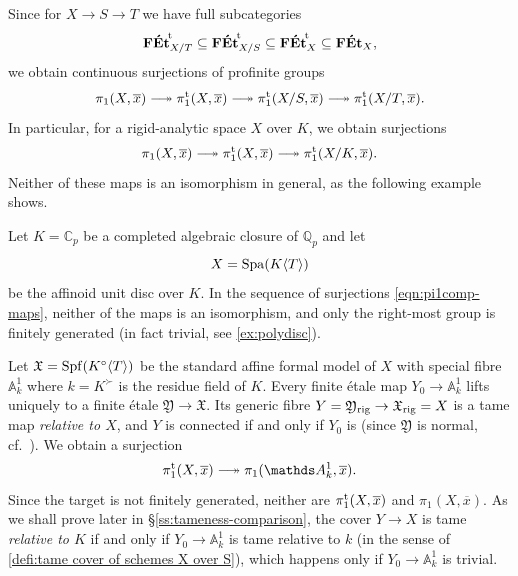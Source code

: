 Since for $X\to S\to T$ we have full subcategories 
\[
    {\mathbf{F\acute{E}t}}^{\!\mathrm{t}}_{X/T}\subseteq  {\mathbf{F\acute{E}t}}^{\!\mathrm{t}}_{X/S}\subseteq {\mathbf{F\acute{E}t}}^{\!\mathrm{t}}_X\subseteq \mathbf{F\acute{E}t}_X,
\]
we obtain continuous surjections of profinite groups
\[ 
    \pi_1(X, \overline{x}) \surj \pitame(X, \overline{x}) \surj \pitame(X/S,\overline{x}) \surj \pitame(X/T,\overline{x}).
\]
In particular, for a rigid-analytic space $X$ over $K$, we obtain surjections
\begin{equation} \label{eqn:pi1comp-maps}
    \pi_1(X, \overline{x}) \surj \pitame(X,\overline{x}) \surj \pitame(X/K,\overline{x}).
\end{equation}
Neither of these maps is an isomorphism in general, as the following example shows. 

\begin{ex} \label{ex:unit-disc-Cp}
    Let $K = \mathbb{C}_p$ be a completed algebraic closure of $\mathbb{Q}_p$ and let 
    \[ 
        X = \operatorname{Spa}(K\langle T\rangle)
    \]
    be the affinoid unit disc over $K$. In the sequence of surjections \eqref{eqn:pi1comp-maps}, neither of the maps is an isomorphism, and only the right-most group is finitely generated (in fact trivial, see \cref{ex:polydisc}). 
    
    Let $\mathfrak{X} = \operatorname{Spf}(K^\circ \langle T\rangle)$ be the standard affine formal model of $X$ with special fibre $\mathbb{A}^1_k$ where $k=K^\succ$ is the residue field of $K$. Every finite \'etale map $Y_0\to \mathbb{A}^1_k$ lifts uniquely to a finite \'etale $\mathfrak{Y}\to \mathfrak{X}$. Its generic fibre $Y=\mathfrak{Y}_{\rm rig}\to \mathfrak{X}_{\rm rig}=X$ is a tame map \emph{relative to $X$}, and $Y$ is connected if and only if $Y_0$ is (since $\mathfrak{Y}$ is normal, cf.~\cite[Lemma A.2+Corollary A.16]{AchingerLaraYoucis2022}). We obtain a surjection
    \[ 
        \pitame(X,\overline{x}) \surj \pi_1(\mathbb{A}^1_k, \overline{x}).
    \]
    Since the target is not finitely generated, neither are $\pi_1^{\mathrm{t}}(X, \overline{x})$ and $\pi_1(X, \overline{x})$. As we shall prove later in \S\ref{ss:tameness-comparison}, the cover $Y\to X$ is tame \emph{relative to $K$} if and only if $Y_0 \to \mathbb{A}^1_k$ is tame relative to $k$ (in the sense of \cref{defi:tame cover of schemes X over S}), which happens only if $Y_0 \to\mathbb{A}^1_k$ is trivial.


\end{ex}
